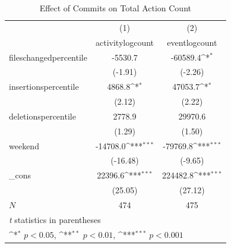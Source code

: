 \documentclass[psamsfonts]{amsart}
\begin{document}
\begin{table}[h!]
\centering
\caption{Effect of Commits on Total Action Count}
{
    \def\sym#1{\ifmmode^{#1}\else\(^{#1}\)\fi}
    \begin{tabular}{l*{2}{c}}
    \hline\hline
        &\multicolumn{1}{c}{(1)}&\multicolumn{1}{c}{(2)}\\
        &\multicolumn{1}{c}{activitylogcount}&\multicolumn{1}{c}{eventlogcount}\\
        \hline
        fileschangedpercentile&     -5530.7         &    -60589.4\sym{*}  \\
        &     (-1.91)         &     (-2.26)         \\
        [1em]
        insertionspercentile&      4868.8\sym{*}  &     47053.7\sym{*}  \\
        &      (2.12)         &      (2.22)         \\
        [1em]
        deletionspercentile&      2778.9         &     29970.6         \\
        &      (1.29)         &      (1.50)         \\
        [1em]
        weekend     &    -14708.0\sym{***}&    -79769.8\sym{***}\\
        &    (-16.48)         &     (-9.65)         \\
        [1em]
        \_cons      &     22396.6\sym{***}&    224482.8\sym{***}\\
        &     (25.05)         &     (27.12)         \\
        \hline
        \(N\)       &         474         &         475         \\
        \hline\hline
        \multicolumn{3}{l}{\footnotesize \textit{t} statistics in parentheses}\\
        \multicolumn{3}{l}{\footnotesize \sym{*} \(p<0.05\), \sym{**} \(p<0.01\), \sym{***} \(p<0.001\)}\\
        \end{tabular}
}
\label{table:total-count-macro}
\end{table}
\end{document}
